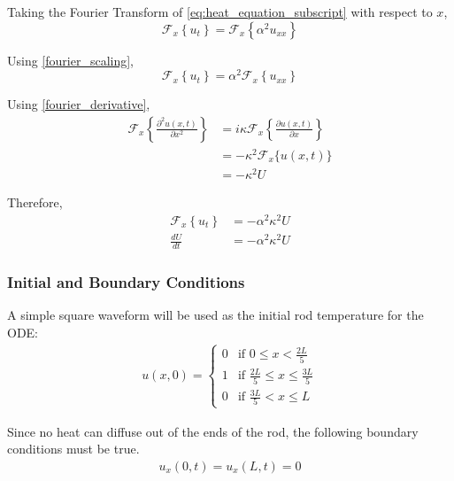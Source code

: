 \vspace{5mm}
\noindent
Taking the Fourier Transform of \cref{eq:heat_equation_subscript} with respect to \(x\),
\begin{equation}
    \mathcal{F}_x \left\{ u_t \right\} = \mathcal{F}_x \left\{ \alpha^2 u_{xx} \right\}
\end{equation}

\noindent
Using \cref{fourier_scaling},
\begin{equation}
    \mathcal{F}_x \left\{ u_t \right\} = \alpha^2 \mathcal{F}_x \left\{ u_{xx} \right\}
\end{equation}

\noindent
Using \cref{fourier_derivative},
\begin{align}
    \mathcal{F}_x \left\{ \frac{\partial^2 u(x, t)}{\partial x^2} \right\} & = i \kappa \mathcal{F}_x \left\{ \frac{\partial u(x, t)}{\partial x} \right\} \\
    & = -\kappa^2 \mathcal{F}_x\{ u(x, t) \} \\
    & = -\kappa^2 U
\end{align}

\noindent
Therefore,
\begin{align}
    \mathcal{F}_x \left\{ u_t \right\} &= -\alpha^2 \kappa^2 U \\
    \frac{dU}{dt} &= -\alpha^2 \kappa^2 U \label{eq:heat_equation_fourier}
\end{align}

\subsubsection{Initial and Boundary Conditions}
\noindent
A simple square waveform will be used as the initial rod temperature for the ODE:
\begin{align}
    u(x, 0) = \label{eq:heat_equation_initial_condition}
    \begin{cases}
        0 & \text{if } 0 \leq x < \frac{2L}{5} \\
        1 & \text{if } \frac{2L}{5} \leq x \leq \frac{3L}{5} \\
        0 & \text{if } \frac{3L}{5} < x \leq L
    \end{cases}
\end{align}

\noindent
Since no heat can diffuse out of the ends of the rod, the following boundary conditions must be true.
\begin{align}
    u_x(0, t) = u_x(L, t) = 0
\end{align}

